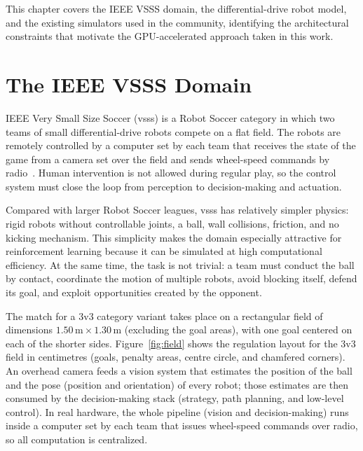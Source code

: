 This chapter covers the IEEE VSSS domain, the differential-drive robot model, and the existing simulators used in the community, identifying the architectural constraints that motivate the GPU-accelerated approach taken in this work.

\section{The IEEE VSSS Domain}

IEEE Very Small Size Soccer (\acrshort{vsss}) is a Robot Soccer category in which two teams
of small differential-drive robots compete on a flat field.  The robots are
remotely controlled by a computer set by each team that receives the state of the
game from a camera set over the field and sends wheel-speed commands by radio~\parencite{robocore_vsss_rules}.  Human
intervention is not allowed during regular play, so the control system must
close the loop from perception to decision-making and actuation.

Compared with larger Robot Soccer leagues, \gls{vsss} has relatively simpler
physics: rigid robots without controllable joints, a ball, wall collisions, friction, and no kicking
mechanism.  This simplicity makes the domain especially attractive for reinforcement
learning because it can be simulated at high computational efficiency.
At the same time, the task is not trivial: a team must conduct the ball by contact, coordinate the motion of multiple robots, avoid blocking itself, defend its goal, and exploit opportunities created by the opponent.

The match for a 3v3 category variant takes place on a rectangular field of dimensions
$1.50\,\text{m} \times 1.30\,\text{m}$ (excluding the goal areas), with one
goal centered on each of the shorter sides.  Figure~\ref{fig:field} shows the
regulation layout for the 3v3 field in centimetres (goals, penalty areas, centre circle, and chamfered corners).  An overhead camera feeds a vision system that estimates the position of the ball and the pose (position and orientation) of every robot; those estimates are then consumed by the decision-making stack (strategy, path planning, and low-level control).
In real hardware, the whole pipeline (vision and decision-making) runs inside a computer set by each team that
issues wheel-speed commands over radio, so all computation is centralized.

